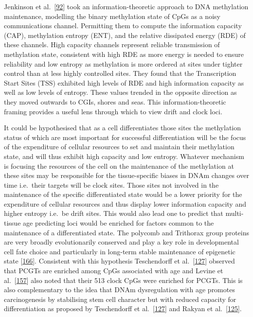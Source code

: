 \documentclass[
]{book}
\begin{document}
Jenkinson et al.~{[}\protect\hyperlink{ref-Jenkinson2017}{92}{]} took an information-theoretic approach to DNA methylation maintenance, modelling the binary methylation state of CpGs as a noisy communications channel.
Permitting them to compute the information capacity (CAP), methylation entropy (ENT), and the relative dissipated energy (RDE) of these channels.
High capacity channels represent reliable transmission of methylation state, consistent with high RDE as more energy is needed to ensure reliability and low entropy as methylation is more ordered at sites under tighter control than at less highly controlled sites.
They found that the Transcription Start Sites (TSS) exhibited high levels of RDE and high information capacity as well as low levels of entropy.
These values trended in the opposite direction as they moved outwards to CGIs, shores and seas.
This information-theoretic framing provides a useful lens through which to view drift and clock loci.

It could be hypothesised that as a cell differentiates those sites the methylation status of which are most important for successful differentiation will be the focus of the expenditure of cellular resources to set and maintain their methylation state, and will thus exhibit high capacity and low entropy.
Whatever mechanism is focusing the resources of the cell on the maintenance of the methylation at these sites may be responsible for the tissue-specific biases in DNAm changes over time i.e.~their targets will be clock sites.
Those sites not involved in the maintenance of the specific differentiated state would be a lower priority for the expenditure of cellular resources and thus display lower information capacity and higher entropy i.e.~be drift sites.
This would also lead one to predict that multi-tissue age predicting loci would be enriched for factors common to the maintenance of a differentiated state.
The polycomb and Trithorax group proteins are very broadly evolutionarily conserved and play a key role in developmental cell fate choice and particularly in long-term stable maintenance of epigenetic state {[}\protect\hyperlink{ref-Schuettengruber2017}{166}{]}.
Consistent with this hypothesis Teschendorff et al.~{[}\protect\hyperlink{ref-Teschendorff2010}{127}{]} observed that PCGTs are enriched among CpGs associated with age and Levine et al.~{[}\protect\hyperlink{ref-Levine2018}{157}{]} also noted that their 513 clock CpGs were enriched for PCGTs.
This is also complementary to the idea that DNAm dysregulation with age promotes carcinogenesis by stabilising stem cell character but with reduced capacity for differentiation as proposed by Teschendorff et al.~{[}\protect\hyperlink{ref-Teschendorff2010}{127}{]} and Rakyan et al.~{[}\protect\hyperlink{ref-Rakyan2010}{125}{]}.
\end{document}
